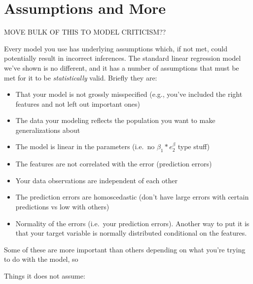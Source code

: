 \documentclass[
  letterpaper,
]{krantz}
\providecommand{\tightlist}{%
  \setlength{\itemsep}{0pt}\setlength{\parskip}{0pt}}\usepackage{longtable,booktabs,array}
\begin{document}
\section{Assumptions and More}\label{assumptions-and-more}

MOVE BULK OF THIS TO MODEL CRITICISM??

Every model you use has underlying assumptions which, if not met, could
potentially result in incorrect inferences. The standard linear
regression model we've shown is no different, and it has a number of
assumptions that must be met for it to be \emph{statistically} valid.
Briefly they are:

\begin{itemize}
\tightlist
\item
  That your model is not grossly misspecified (e.g., you've included the
  right features and not left out important ones)
\item
  The data your modeling reflects the population you want to make
  generalizations about
\item
  The model is linear in the parameters (i.e.~no \(\beta_1*e^\beta_2\)
  type stuff)
\item
  The features are not correlated with the error (prediction errors)
\item
  Your data observations are independent of each other
\item
  The prediction errors are homoscedastic (don't have large errors with
  certain predictions vs low with others)
\item
  Normality of the errors (i.e.~your prediction errors). Another way to
  put it is that your target variable is normally distributed
  conditional on the features.
\end{itemize}

Some of these are more important than others depending on what you're
trying to do with the model, so

Things it does not assume:
\end{document}
